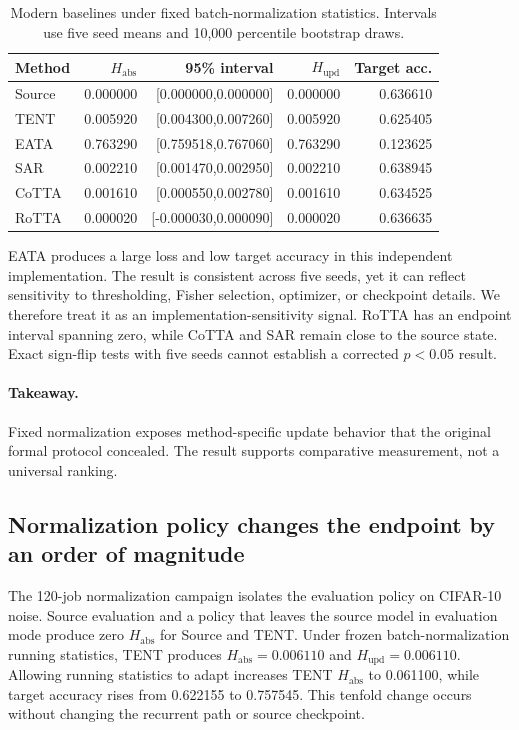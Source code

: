 \documentclass[11pt]{article}
\begin{document}
\begin{table}[t]
\centering\scriptsize
\caption{Modern baselines under fixed batch-normalization statistics. Intervals use five seed means and 10,000 percentile bootstrap draws.}
\label{tab:modern}
\begin{tabular}{lrrrr}
\toprule
Method & $H_{\mathrm{abs}}$ & 95\% interval & $H_{\mathrm{upd}}$ & Target acc.\\
\midrule
Source & 0.000000 & [0.000000,0.000000] & 0.000000 & 0.636610\\
TENT & 0.005920 & [0.004300,0.007260] & 0.005920 & 0.625405\\
EATA & 0.763290 & [0.759518,0.767060] & 0.763290 & 0.123625\\
SAR & 0.002210 & [0.001470,0.002950] & 0.002210 & 0.638945\\
CoTTA & 0.001610 & [0.000550,0.002780] & 0.001610 & 0.634525\\
RoTTA & 0.000020 & [-0.000030,0.000090] & 0.000020 & 0.636635\\
\bottomrule
\end{tabular}
\end{table}

EATA produces a large loss and low target accuracy in this independent implementation. The result is consistent across five seeds, yet it can reflect sensitivity to thresholding, Fisher selection, optimizer, or checkpoint details. We therefore treat it as an implementation-sensitivity signal. RoTTA has an endpoint interval spanning zero, while CoTTA and SAR remain close to the source state. Exact sign-flip tests with five seeds cannot establish a corrected $p<0.05$ result.

\paragraph{Takeaway.}
Fixed normalization exposes method-specific update behavior that the original formal protocol concealed. The result supports comparative measurement, not a universal ranking.

\subsection{Normalization policy changes the endpoint by an order of magnitude}
\label{sec:normalization-ablation}

The 120-job normalization campaign isolates the evaluation policy on CIFAR-10 noise. Source evaluation and a policy that leaves the source model in evaluation mode produce zero $H_{\mathrm{abs}}$ for Source and TENT. Under frozen batch-normalization running statistics, TENT produces $H_{\mathrm{abs}}=0.006110$ and $H_{\mathrm{upd}}=0.006110$. Allowing running statistics to adapt increases TENT $H_{\mathrm{abs}}$ to 0.061100, while target accuracy rises from 0.622155 to 0.757545. This tenfold change occurs without changing the recurrent path or source checkpoint.
\end{document}
